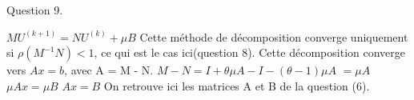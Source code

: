 \documentclass[a4paper,11pt]{article}
\begin{document}
    Question 9.

    $M U^{(k+1)} = NU^{(k)} + \mu B$
    Cette méthode de décomposition converge uniquement si $\rho(M^{-1}N) < 1$, ce qui est le cas ici(question 8).
    \newline
    Cette décomposition converge vers $Ax = b$, avec A = M - N.
    \newline
    $M - N = I + \theta \mu A - I - (\theta - 1) \mu A$
    $ = \mu A $
    \newline
    $\mu A x = \mu B$
    $A x = B$
    On retrouve ici les matrices A et B de la question (6).
\end{document}
